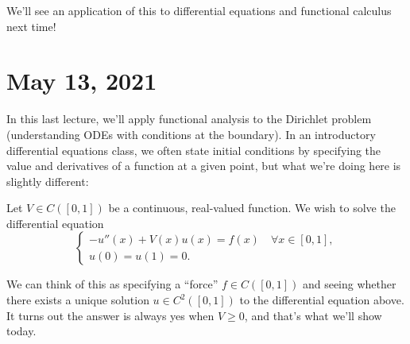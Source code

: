 We'll see an application of this to differential equations and functional calculus next time!


\pagebreak\section*{May 13, 2021}

In this last lecture, we'll apply functional analysis to the Dirichlet problem (understanding ODEs with conditions at the boundary). In an introductory differential equations class, we often state initial conditions by specifying the value and derivatives of a function at a given point, but what we're doing here is slightly different:

\begin{problem}
Let $V \in C([0, 1])$ be a continuous, real-valued function. We wish to solve the differential equation 
\[
    \begin{cases} -u''(x) + V(x) u(x) = f(x) \quad \forall x \in [0, 1], \\ u(0) = u(1) = 0. \end{cases}
\]
\end{problem}

We can think of this as specifying a ``force'' $f \in C([0, 1])$ and seeing whether there exists a unique solution $u \in C^2([0, 1])$ to the differential equation above. It turns out the answer is always yes when $V \ge 0$, and that's what we'll show today. 

